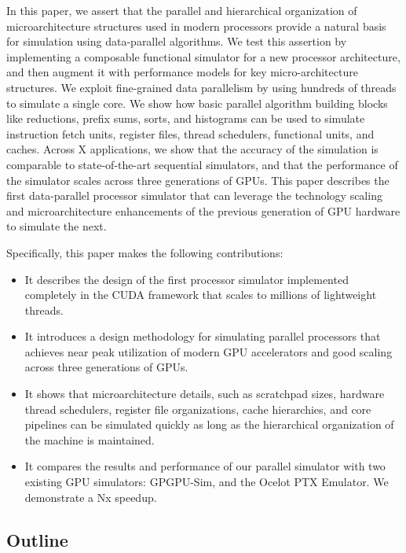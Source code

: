 \documentclass[conference, 10pt]{IEEEtran}
\begin{document}
In this paper, we assert that the parallel and hierarchical organization of
microarchitecture structures used in modern processors provide a natural
basis for simulation using data-parallel algorithms.  We test this assertion by
implementing a composable functional simulator for a new processor architecture,
and then augment it with performance models for key micro-architecture
structures.  We exploit fine-grained data parallelism by using hundreds of
threads to simulate a single core.  We show how basic parallel algorithm
building blocks like reductions, prefix sums, sorts, and histograms can be used
to simulate instruction fetch units, register files, thread schedulers,
functional units, and caches.  Across X applications, we show that the accuracy
of the simulation is comparable to state-of-the-art sequential simulators, and
that the performance of the simulator scales across three generations of GPUs.
This paper describes the first data-parallel processor simulator that can 
leverage the technology scaling and microarchitecture enhancements of the
previous generation of GPU hardware to simulate the next.

Specifically, this paper makes the following contributions:

\begin{itemize}
	\item It describes the design of the first processor simulator implemented
		completely in the CUDA framework that scales to millions of
		lightweight threads.

	\item It introduces a design methodology for simulating parallel processors
		that achieves near peak utilization of modern GPU accelerators and
		good scaling across three generations of GPUs.
		
	\item It shows that microarchitecture details, such as scratchpad sizes,
		hardware thread schedulers, register file organizations, cache
		hierarchies, and core pipelines can be simulated quickly as long as
		the hierarchical organization of the machine is maintained.
	
	\item It compares the results and performance of our parallel simulator with
		two existing GPU simulators: GPGPU-Sim, and the Ocelot PTX Emulator.  
		We demonstrate a Nx speedup.
\end{itemize}

\subsection{Outline}
\end{document}
